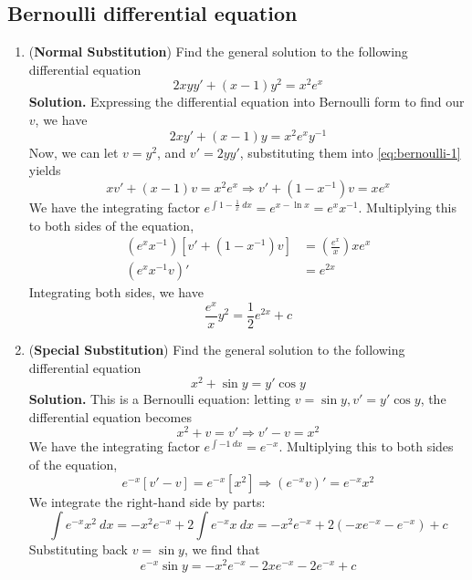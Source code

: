 \documentclass{article}
\begin{document}
\subsection{Bernoulli differential equation}
\begin{enumerate}
    \item (\textbf{Normal Substitution}) Find the general solution to the following differential equation
    \begin{equation}
        2xyy'+(x-1)y^2=x^2e^x
    \end{equation} \label{eq:bernoulli-1}
    \textbf{Solution.} Expressing the differential equation into Bernoulli form to find our $v$, we have
    \begin{equation*}
        2xy'+(x-1)y=x^2e^xy^{-1}
    \end{equation*}
    Now, we can let $v=y^2$, and $v'=2yy'$, substituting them into \ref{eq:bernoulli-1} yields
    \begin{equation*}
        xv'+(x-1)v=x^2e^x \Rightarrow v'+(1-x^{-1})v=xe^x
    \end{equation*}
    We have the integrating factor $e^{\int 1-\frac{1}{x}~dx}=e^{x-\ln x}=e^xx^{-1}$. Multiplying this to both sides of the equation,
    \begin{align*}
        (e^xx^{-1})[v'+(1-x^{-1})v]&=(\frac{e^x}{x})xe^x \\
        (e^xx^{-1}v)'&=e^{2x}
    \end{align*}
    Integrating both sides, we have
    \begin{equation*}
        \frac{e^x}{x}y^2=\frac{1}{2}e^{2x}+c
    \end{equation*}
    \item (\textbf{Special Substitution}) Find the general solution to the following differential equation
    \begin{equation}
        x^2+\sin y=y'\cos y
    \end{equation}
    \textbf{Solution.} This is a Bernoulli equation: letting $v=\sin y,v'=y'\cos y$, the differential equation becomes
    \begin{equation*}
        x^2+v=v'\Rightarrow v'-v=x^2
    \end{equation*}
    We have the integrating factor $e^{\int-1~dx}=e^{-x}$. Multiplying this to both sides of the equation,
    \begin{equation*}
        e^{-x}[v'-v]=e^{-x}[x^2]\Rightarrow (e^{-x}v)'=e^{-x}x^2
    \end{equation*}
    We integrate the right-hand side by parts:
    \begin{equation*}
        \int e^{-x}x^2~dx=-x^2e^{-x}+2\int e^{-x}x~dx=-x^2e^{-x}+2(-xe^{-x}-e^{-x})+c
    \end{equation*}
    Substituting back $v=\sin y$, we find that
    \begin{equation*}
        e^{-x}\sin y=-x^2e^{-x}-2xe^{-x}-2e^{-x}+c
    \end{equation*}    
\end{enumerate}
\newpage
\end{document}
